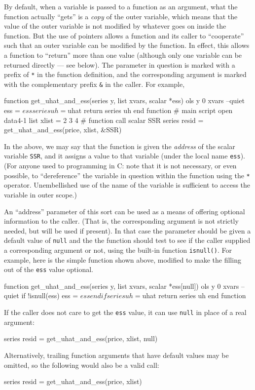 By default, when a variable is passed to a function as an argument,
what the function actually ``gets'' is a \emph{copy} of the outer
variable, which means that the value of the outer variable is not
modified by whatever goes on inside the function.  But the use of
pointers allows a function and its caller to ``cooperate'' such that
an outer variable can be modified by the function.  In effect, this
allows a function to ``return'' more than one value (although only one
variable can be returned directly --- see below).  The parameter in
question is marked with a prefix of \texttt{*} in the function
definition, and the corresponding argument is marked with the
complementary prefix \verb+&+ in the caller.  For example,
%
\begin{code}
function get_uhat_and_ess(series y, list xvars, scalar *ess)
  ols y 0 xvars --quiet
  ess = $ess
  series uh = $uhat
  return series uh
end function
# main script
open data4-1
list xlist = 2 3 4
# function call
scalar SSR
series resid = get_uhat_and_ess(price, xlist, &SSR)
\end{code}
%
In the above, we may say that the function is given the \emph{address}
of the scalar variable \texttt{SSR}, and it assigns a value to that
variable (under the local name \texttt{ess}).  (For anyone used to
programming in C: note that it is not necessary, or even possible, to
``dereference'' the variable in question within the function using the
\texttt{*} operator.  Unembellished use of the name of the variable is
sufficient to access the variable in outer scope.)

An ``address'' parameter of this sort can be used as a means of
offering optional information to the caller.  (That is, the
corresponding argument is not strictly needed, but will be used if
present).  In that case the parameter should be given a default value
of \texttt{null} and the the function should test to see if the caller
supplied a corresponding argument or not, using the built-in function
\texttt{isnull()}.  For example, here is the simple function shown
above, modified to make the filling out of the \texttt{ess} value
optional.
%
\begin{code}
function get_uhat_and_ess(series y, list xvars, scalar *ess[null])
  ols y 0 xvars --quiet
  if !isnull(ess) 
     ess = $ess
  endif
  series uh = $uhat
  return series uh
end function
\end{code}
%
If the caller does not care to get the \texttt{ess} value, it can
use \texttt{null} in place of a real argument:
%
\begin{code}
series resid = get_uhat_and_ess(price, xlist, null)
\end{code}
%
Alternatively, trailing function arguments that have default values 
may be omitted, so the following would also be a valid call:
%
\begin{code}
series resid = get_uhat_and_ess(price, xlist)
\end{code}

